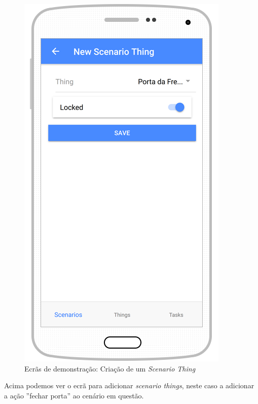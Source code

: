 \begin{figure}[H]
  \centering
        \includegraphics[scale=0.75]{img/demo/new_scenario_thing_lock.png}
  \caption{Ecrãs de demonstração: Criação de um \textit{Scenario Thing}}
\end{figure}

Acima podemos ver o ecrã para adicionar \textit{scenario things}, neste caso a adicionar a ação ''fechar porta'' ao cenário em questão.

